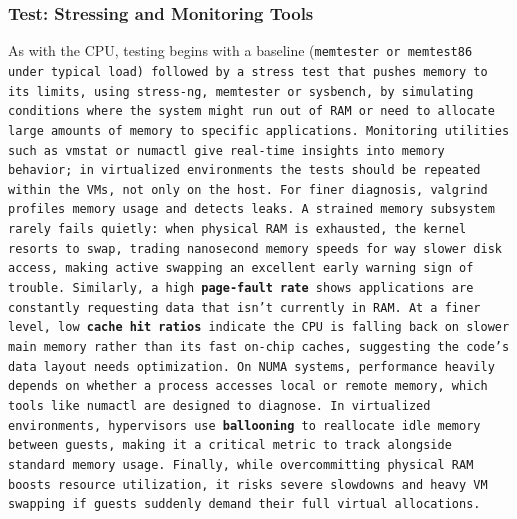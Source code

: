 \vspace{-0.5em}

\subsubsection{Test: Stressing and Monitoring Tools}

As with the CPU, testing begins with a baseline (\tt{memtester} or \tt{memtest86} under typical load) followed by a stress test that pushes memory to its limits, using \tt{stress-ng}, \tt{memtester} or \tt{sysbench}, by simulating conditions where the system might run out of RAM or need to allocate large amounts of memory to specific applications. Monitoring utilities such as \tt{vmstat} or \tt{numactl} give real-time insights into memory behavior; in virtualized environments the tests should be repeated within the VMs, not only on the host. For finer diagnosis, \tt{valgrind} profiles memory usage and detects leaks.
A strained memory subsystem rarely fails quietly: when physical RAM is exhausted, the kernel resorts to \tt{swap}, trading nanosecond memory speeds for way slower disk access, making active swapping an excellent early warning sign of trouble. Similarly, a high \textbf{page-fault rate} shows applications are constantly requesting data that isn't currently in RAM. At a finer level, low \textbf{cache hit ratios} indicate the CPU is falling back on slower main memory rather than its fast on-chip caches, suggesting the code's data layout needs optimization. On NUMA systems, performance heavily depends on whether a process accesses local or remote memory, which tools like \tt{numactl} are designed to diagnose. In virtualized environments, hypervisors use \textbf{ballooning} to reallocate idle memory between guests, making it a critical metric to track alongside standard memory usage. Finally, while overcommitting physical RAM boosts resource utilization, it risks severe slowdowns and heavy VM swapping if guests suddenly demand their full virtual allocations.

